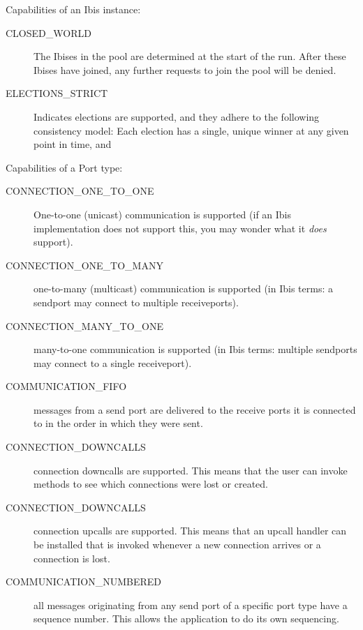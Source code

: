 \documentclass[10pt]{article}
\begin{document}
Capabilities of an Ibis instance:

\begin{description}

\item[CLOSED\_WORLD]
The Ibises in the pool are determined at the start of the
run. After these Ibises have joined, any further requests to join the
pool will be denied.

\item[ELECTIONS\_STRICT]
Indicates elections are supported, and they adhere to the following 
consistency model: Each election has a single, unique winner at any
given point in time, and


\end{description}

Capabilities of a Port type:

\begin{description}
\item[CONNECTION\_ONE\_TO\_ONE]
One-to-one (unicast) communication is supported (if an Ibis
implementation
does not support this, you may wonder what it \emph{does} support).

\item[CONNECTION\_ONE\_TO\_MANY]
one-to-many (multicast) communication is supported
(in Ibis terms: a sendport
may connect to multiple receiveports).

\item[CONNECTION\_MANY\_TO\_ONE]
many-to-one communication is supported (in Ibis terms: multiple
sendports may connect to a single receiveport).

\item[COMMUNICATION\_FIFO]
messages from a send port are delivered to the receive ports it is
connected to in the order in which they were sent.

\item[CONNECTION\_DOWNCALLS]
connection downcalls are supported. This means that the user can
invoke methods to see which connections were lost or created.

\item[CONNECTION\_DOWNCALLS]
connection upcalls are supported. This means that an upcall
handler can be installed that is invoked whenever a new connection
arrives
or a connection is lost.

\item[COMMUNICATION\_NUMBERED]
all messages originating from any send port of a specific port type have
a sequence number. This allows the application to do its own sequencing.


\end{description}
\end{document}
